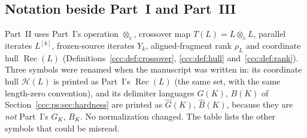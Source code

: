 \documentclass[11pt,letterpaper]{article}
\theoremstyle{definition}
\theoremstyle{remark}
\newcommand{\rec}{\operatorname{Rec}}
\newcommand{\cut}{\otimes_{\mathrm c}}
\newcommand{\gen}[2]{#1^{[#2]}}
\newcommand{\rank}{\rho}
\begin{document}
\subsection{Notation beside Part~I and Part~III}\label{ccc:ps:sec:notation}

Part~II uses Part~I's operation $\cut$, crossover map $T(L)=L\cut L$,
parallel iterates $\gen Lk$, frozen-source iterates $Y_k$, aligned-fragment
rank $\rank_L$ and coordinate hull $\rec(L)$ (Definitions~\ref{ccc:def:crossover},
\ref{ccc:def:hull} and~\ref{ccc:def:rank}). Three symbols were renamed when the
manuscript was written in: its coordinate hull $\mathcal H(L)$ is printed as
Part~I's $\rec(L)$ (the same set, with the same length-zero convention), and
its delimiter languages $G(K)$, $B(K)$ of Section~\ref{ccc:ps:sec:hardness}
are printed as $\widehat G(K)$, $\widehat B(K)$, because they are \emph{not}
Part~I's $G_K$, $B_K$. No normalization changed. The table lists the other
symbols that could be misread.
\end{document}
